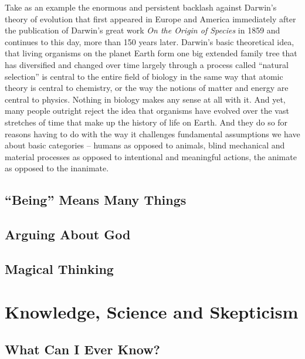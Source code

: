 \documentclass[
  12pt, openany]{book}
\begin{document}
Take as an example the enormous and persistent backlash against Darwin's theory of evolution that first appeared in Europe and America immediately after the publication of Darwin's great work \emph{On the Origin of Species} in 1859 and continues to this day, more than 150 years later. Darwin's basic theoretical idea, that living organisms on the planet Earth form one big extended family tree that has diversified and changed over time largely through a process called ``natural selection'' is central to the entire field of biology in the same way that atomic theory is central to chemistry, or the way the notions of matter and energy are central to physics. Nothing in biology makes any sense at all with it. And yet, many people outright reject the idea that organisms have evolved over the vast stretches of time that make up the history of life on Earth. And they do so for reasons having to do with the way it challenges fundamental assumptions we have about basic categories -- humans as opposed to animals, blind mechanical and material processes as opposed to intentional and meaningful actions, the animate as opposed to the inanimate.

\hypertarget{being-means-many-things}{%
\section{``Being'' Means Many Things}\label{being-means-many-things}}

\hypertarget{arguing-about-god}{%
\section{Arguing About God}\label{arguing-about-god}}

\hypertarget{magical-thinking}{%
\section{Magical Thinking}\label{magical-thinking}}

\hypertarget{knowledge-science-and-skepticism}{%
\chapter{Knowledge, Science and Skepticism}\label{knowledge-science-and-skepticism}}

\hypertarget{what-can-i-ever-know}{%
\section{What Can I Ever Know?}\label{what-can-i-ever-know}}
\end{document}
